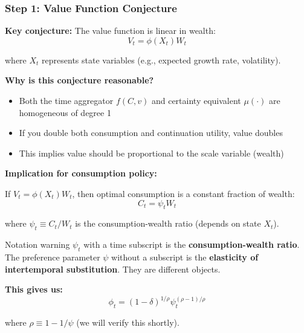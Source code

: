 \documentclass{beamer}
\begin{document}
\begin{frame}[allowframebreaks]
    \frametitle{Step 1: Value Function Conjecture}
    
    \textbf{Key conjecture:} The value function is linear in wealth:
    \begin{equation*}
        V_t = \phi(X_t) W_t
    \end{equation*}
    
    where $X_t$ represents state variables (e.g., expected growth rate, volatility).
    
    \textbf{Why is this conjecture reasonable?}
    \begin{itemize}
        \item Both the time aggregator $f(C, v)$ and certainty equivalent $\mu(\cdot)$ are homogeneous of degree 1
        \item If you double both consumption and continuation utility, value doubles
        \item This implies value should be proportional to the scale variable (wealth)
    \end{itemize}
    
    \framebreak
    
    \textbf{Implication for consumption policy:}
    
    If $V_t = \phi(X_t) W_t$, then optimal consumption is a constant fraction of wealth:
    \begin{equation*}
        C_t = \psi_t W_t
    \end{equation*}
    
    where $\psi_t \equiv C_t/W_t$ is the consumption-wealth ratio (depends on state $X_t$).
    \begin{block}{Notation warning}
        $\psi_t$ with a time subscript is the \textbf{consumption-wealth ratio}. The preference parameter $\psi$ without a subscript is the \textbf{elasticity of intertemporal substitution}. They are different objects.
    \end{block}
    
    \textbf{This gives us:}
    \begin{equation*}
        \phi_t = (1-\delta)^{1/\rho} \psi_t^{(\rho-1)/\rho}
    \end{equation*}
    
    where $\rho \equiv 1 - 1/\psi$ (we will verify this shortly).
\end{frame}
\end{document}
